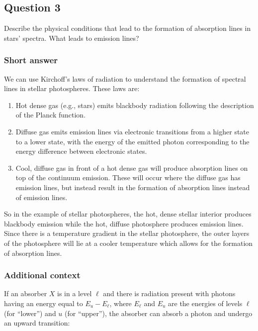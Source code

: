 \documentclass[a4paper,10pt]{article}
\begin{document}

\newpage
\subsection{Question 3}

Describe the physical conditions that lead to the formation of absorption lines in stars' spectra. What leads to emission lines?

\subsubsection{Short answer}

We can use Kirchoff's laws of radiation to understand the formation of spectral lines in stellar photospheres. These laws are:

\begin{enumerate}
    \item Hot dense gas (e.g., stars) emits blackbody radiation following the description of the Planck function.
    \item Diffuse gas emits emission lines via electronic transitions from a higher state to a lower state, with the energy of the emitted photon corresponding to the energy difference between electronic states.
    \item Cool, diffuse gas in front of a hot dense gas will produce absorption lines on top of the continuum emission. These will occur where the diffuse gas has emission lines, but instead result in the formation of absorption lines instead of emission lines.
\end{enumerate}

{\noindent}So in the example of stellar photospheres, the hot, dense stellar interior produces blackbody emission while the hot, diffuse photosphere produces emission lines. Since there is a temperature gradient in the stellar photosphere, the outer layers of the photosphere will lie at a cooler temperature which allows for the formation of absorption lines.

\subsubsection{Additional context}

If an absorber $X$ is in a level $\ell$ and there is radiation present with photons having an energy equal to $E_u-E_\ell$, where $E_\ell$ and $E_u$ are the energies of levels $\ell$ (for ``lower'') and $u$ (for ``upper''), the absorber can absorb a photon and undergo an upward transition:
\end{document}
